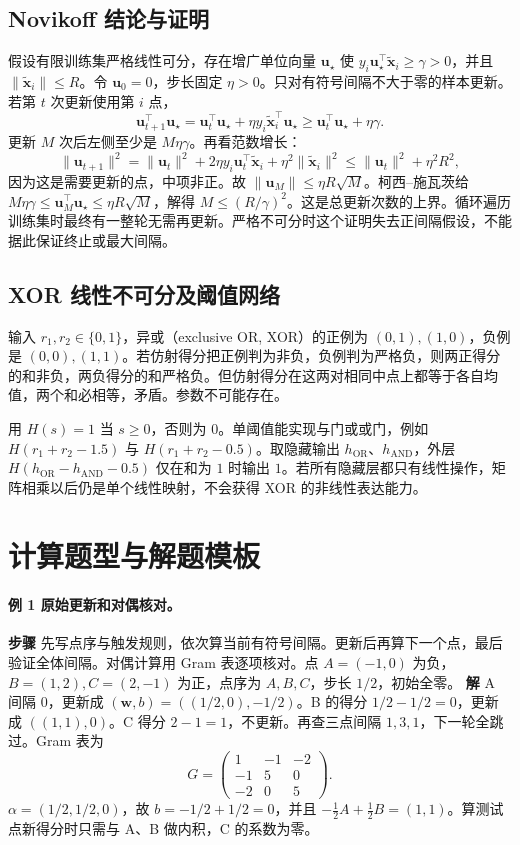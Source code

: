 \documentclass[UTF8,a4paper,zihao=-4,fontset=fandol]{ctexrep}
\begin{document}
\subsection*{Novikoff 结论与证明}
假设有限训练集严格线性可分，存在增广单位向量 \(\bm u_\star\) 使 \(y_i\bm u_\star^\top\tilde{\bm x}_i\ge\gamma>0\)，并且 \(\|\tilde{\bm x}_i\|\le R\)。令 \(\bm u_0=0\)，步长固定 \(\eta>0\)。只对有符号间隔不大于零的样本更新。若第 \(t\) 次更新使用第 \(i\) 点，
\[
 \bm u_{t+1}^\top\bm u_\star
 =\bm u_t^\top\bm u_\star+\eta y_i\tilde{\bm x}_i^\top\bm u_\star
 \ge\bm u_t^\top\bm u_\star+\eta\gamma.
\]
更新 \(M\) 次后左侧至少是 \(M\eta\gamma\)。再看范数增长：
\[
 \|\bm u_{t+1}\|^2
 =\|\bm u_t\|^2+2\eta y_i\bm u_t^\top\tilde{\bm x}_i
                  +\eta^2\|\tilde{\bm x}_i\|^2
 \le\|\bm u_t\|^2+\eta^2 R^2,
\]
因为这是需要更新的点，中项非正。故 \(\|\bm u_M\|\le\eta R\sqrt M\)。柯西--施瓦茨给 \(M\eta\gamma\le\bm u_M^\top\bm u_\star\le\eta R\sqrt M\)，解得 \(M\le (R/\gamma)^2\)。这是总更新次数的上界。循环遍历训练集时最终有一整轮无需再更新。严格不可分时这个证明失去正间隔假设，不能据此保证终止或最大间隔。

\subsection*{XOR 线性不可分及阈值网络}
输入 \(r_1,r_2\in\{0,1\}\)，异或（exclusive OR, XOR）的正例为 \((0,1),(1,0)\)，负例是 \((0,0),(1,1)\)。若仿射得分把正例判为非负，负例判为严格负，则两正得分的和非负，两负得分的和严格负。但仿射得分在这两对相同中点上都等于各自均值，两个和必相等，矛盾。参数不可能存在。
 
用 \(H(s)=1\) 当 \(s\ge0\)，否则为 \(0\)。单阈值能实现与门或或门，例如 \(H(r_1+r_2-1.5)\) 与 \(H(r_1+r_2-0.5)\)。取隐藏输出 \(h_{\mathrm{OR}}\)、\(h_{\mathrm{AND}}\)，外层 \(H(h_{\mathrm{OR}}-h_{\mathrm{AND}}-0.5)\) 仅在和为 \(1\) 时输出 \(1\)。若所有隐藏层都只有线性操作，矩阵相乘以后仍是单个线性映射，不会获得 XOR 的非线性表达能力。

\section{计算题型与解题模板}
\paragraph{例 1 原始更新和对偶核对。}
\textbf{步骤} 先写点序与触发规则，依次算当前有符号间隔。更新后再算下一个点，最后验证全体间隔。对偶计算用 Gram 表逐项核对。点 \(A=(-1,0)\) 为负，\(B=(1,2),C=(2,-1)\) 为正，点序为 \(A,B,C\)，步长 \(1/2\)，初始全零。
\textbf{解} A 间隔 0，更新成 \((\bm w,b)=((1/2,0),-1/2)\)。B 的得分 \(1/2-1/2=0\)，更新成 \(((1,1),0)\)。C 得分 \(2-1=1\)，不更新。再查三点间隔 \(1,3,1\)，下一轮全跳过。Gram 表为
\[
 G=\begin{pmatrix}1&-1&-2\\-1&5&0\\-2&0&5\end{pmatrix}.
\]
\(\alpha=(1/2,1/2,0)\)，故 \(b=-1/2+1/2=0\)，并且 \(-\tfrac12A+\tfrac12B=(1,1)\)。算测试点新得分时只需与 A、B 做内积，C 的系数为零。
\end{document}
